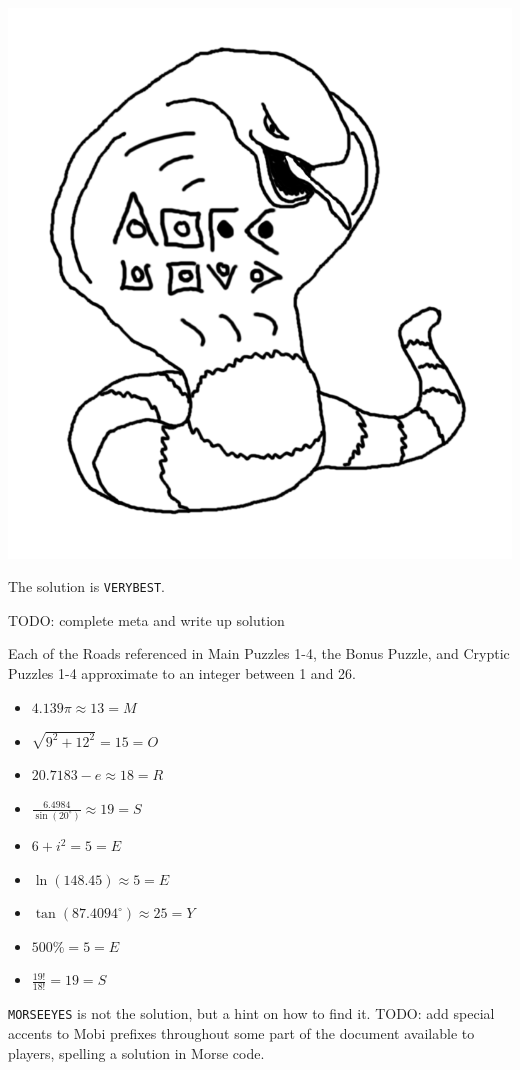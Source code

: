 \begin{center}
\includegraphics[width=0.3\linewidth]{assets/not-arbok-solution.png}
\end{center}

The solution is \texttt{VERYBEST}.


TODO: complete meta and write up solution


Each of the Roads referenced in Main Puzzles 1-4, the Bonus Puzzle,
and Cryptic Puzzles 1-4 approximate to an integer between 1 and 26.

\begin{multicols}{3}
\begin{itemize}
  \item \(4.139\pi\approx13=M\)
  \item \(\sqrt{9^2+12^2}=15=O\)
  \item \(20.7183-e\approx18=R\)
  \item \(\frac{6.4984}{\sin(20^\circ)}\approx19=S\)
  \item \(6+i^2=5=E\)
  \item \(\ln(148.45)\approx5=E\)
  \item \(\tan(87.4094^\circ)\approx25=Y\)
  \item \(500\%=5=E\)
  \item \(\frac{19!}{18!}=19=S\)
\end{itemize}
\end{multicols}

\texttt{MORSEEYES} is not the solution, but a hint on how to find it.
TODO: add special accents to Mobi prefixes throughout some part of the
document available to players, spelling a solution in Morse code.

